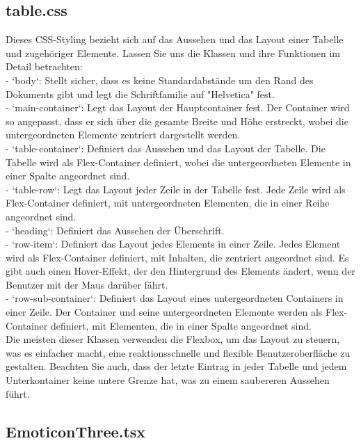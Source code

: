 \documentclass[./dokumentation.tex]{subfiles}
\begin{document}
\subsection{table.css}
Dieses CSS-Styling bezieht sich auf das Aussehen und das Layout einer Tabelle und zugehöriger Elemente. Lassen Sie uns die Klassen und ihre Funktionen im Detail betrachten:\\
- `body`: Stellt sicher, dass es keine Standardabstände um den Rand des Dokuments gibt und legt die Schriftfamilie auf "Helvetica" fest.\\
- `main-container`: Legt das Layout der Hauptcontainer fest. Der Container wird so angepasst, dass er sich über die gesamte Breite und Höhe erstreckt, wobei die untergeordneten Elemente zentriert dargestellt werden.\\
- `table-container`: Definiert das Aussehen und das Layout der Tabelle. Die Tabelle wird als Flex-Container definiert, wobei die untergeordneten Elemente in einer Spalte angeordnet sind.\\
- `table-row`: Legt das Layout jeder Zeile in der Tabelle fest. Jede Zeile wird als Flex-Container definiert, mit untergeordneten Elementen, die in einer Reihe angeordnet sind.\\
- `heading`: Definiert das Aussehen der Überschrift.\\
- `row-item`: Definiert das Layout jedes Elements in einer Zeile. Jedes Element wird als Flex-Container definiert, mit Inhalten, die zentriert angeordnet sind. Es gibt auch einen Hover-Effekt, der den Hintergrund des Elements ändert, wenn der Benutzer mit der Maus darüber fährt.\\
- `row-sub-container`: Definiert das Layout eines untergeordneten Containers in einer Zeile. Der Container und seine untergeordneten Elemente werden als Flex-Container definiert, mit Elementen, die in einer Spalte angeordnet sind.\\
Die meisten dieser Klassen verwenden die Flexbox, um das Layout zu steuern, was es einfacher macht, eine reaktionsschnelle und flexible Benutzeroberfläche zu gestalten. Beachten Sie auch, dass der letzte Eintrag in jeder Tabelle und jedem Unterkontainer keine untere Grenze hat, was zu einem saubereren Aussehen führt.

\subsection{EmoticonThree.tsx}
\end{document}
